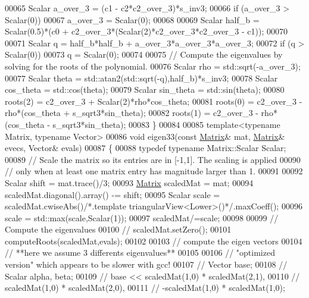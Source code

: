 \begin{DoxyCode}
00065   Scalar a\_over\_3 = (c1 - c2*c2\_over\_3)*s\_inv3;
00066   \textcolor{keywordflow}{if} (a\_over\_3 > Scalar(0))
00067     a\_over\_3 = Scalar(0);
00068 
00069   Scalar half\_b = Scalar(0.5)*(c0 + c2\_over\_3*(Scalar(2)*c2\_over\_3*c2\_over\_3 - c1));
00070 
00071   Scalar q = half\_b*half\_b + a\_over\_3*a\_over\_3*a\_over\_3;
00072   \textcolor{keywordflow}{if} (q > Scalar(0))
00073     q = Scalar(0);
00074 
00075   \textcolor{comment}{// Compute the eigenvalues by solving for the roots of the polynomial.}
00076   Scalar rho = std::sqrt(-a\_over\_3);
00077   Scalar theta = std::atan2(std::sqrt(-q),half\_b)*s\_inv3;
00078   Scalar cos\_theta = std::cos(theta);
00079   Scalar sin\_theta = std::sin(theta);
00080   roots(2) = c2\_over\_3 + Scalar(2)*rho*cos\_theta;
00081   roots(0) = c2\_over\_3 - rho*(cos\_theta + s\_sqrt3*sin\_theta);
00082   roots(1) = c2\_over\_3 - rho*(cos\_theta - s\_sqrt3*sin\_theta);
00083 \}
00084 
00085 \textcolor{keyword}{template}<\textcolor{keyword}{typename} Matrix, \textcolor{keyword}{typename} Vector>
00086 \textcolor{keywordtype}{void} eigen33(\textcolor{keyword}{const} \hyperlink{group___core___module_class_eigen_1_1_matrix}{Matrix}& mat, \hyperlink{group___core___module_class_eigen_1_1_matrix}{Matrix}& evecs, Vector& evals)
00087 \{
00088   \textcolor{keyword}{typedef} \textcolor{keyword}{typename} Matrix::Scalar Scalar;
00089   \textcolor{comment}{// Scale the matrix so its entries are in [-1,1].  The scaling is applied}
00090   \textcolor{comment}{// only when at least one matrix entry has magnitude larger than 1.}
00091 
00092   Scalar shift = mat.trace()/3;
00093   \hyperlink{group___core___module_class_eigen_1_1_matrix}{Matrix} scaledMat = mat;
00094   scaledMat.diagonal().array() -= shift;
00095   Scalar scale = scaledMat.cwiseAbs()\textcolor{comment}{/*.template triangularView<Lower>()*/}.maxCoeff();
00096   scale = std::max(scale,Scalar(1));
00097   scaledMat/=scale;
00098 
00099   \textcolor{comment}{// Compute the eigenvalues}
00100 \textcolor{comment}{//   scaledMat.setZero();}
00101   computeRoots(scaledMat,evals);
00102 
00103   \textcolor{comment}{// compute the eigen vectors}
00104   \textcolor{comment}{// **here we assume 3 differents eigenvalues**}
00105 
00106   \textcolor{comment}{// "optimized version" which appears to be slower with gcc!}
00107 \textcolor{comment}{//     Vector base;}
00108 \textcolor{comment}{//     Scalar alpha, beta;}
00109 \textcolor{comment}{//     base <<   scaledMat(1,0) * scaledMat(2,1),}
00110 \textcolor{comment}{//               scaledMat(1,0) * scaledMat(2,0),}
00111 \textcolor{comment}{//              -scaledMat(1,0) * scaledMat(1,0);}

\end{DoxyCode}
